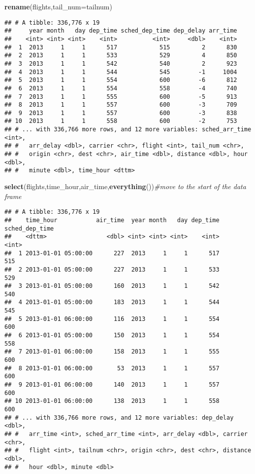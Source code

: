 \documentclass[]{article}
\newenvironment{Shaded}{\begin{snugshade}}{\end{snugshade}}
\newcommand{\CommentTok}[1]{\textcolor[rgb]{0.56,0.35,0.01}{\textit{#1}}}
\newcommand{\DataTypeTok}[1]{\textcolor[rgb]{0.13,0.29,0.53}{#1}}
\newcommand{\KeywordTok}[1]{\textcolor[rgb]{0.13,0.29,0.53}{\textbf{#1}}}
\newcommand{\NormalTok}[1]{#1}
\begin{document}
\begin{Shaded}
\begin{Highlighting}[]
\KeywordTok{rename}\NormalTok{(flights,}\DataTypeTok{tail_num=}\NormalTok{tailnum)}
\end{Highlighting}
\end{Shaded}

\begin{verbatim}
## # A tibble: 336,776 x 19
##     year month   day dep_time sched_dep_time dep_delay arr_time
##    <int> <int> <int>    <int>          <int>     <dbl>    <int>
##  1  2013     1     1      517            515         2      830
##  2  2013     1     1      533            529         4      850
##  3  2013     1     1      542            540         2      923
##  4  2013     1     1      544            545        -1     1004
##  5  2013     1     1      554            600        -6      812
##  6  2013     1     1      554            558        -4      740
##  7  2013     1     1      555            600        -5      913
##  8  2013     1     1      557            600        -3      709
##  9  2013     1     1      557            600        -3      838
## 10  2013     1     1      558            600        -2      753
## # ... with 336,766 more rows, and 12 more variables: sched_arr_time <int>,
## #   arr_delay <dbl>, carrier <chr>, flight <int>, tail_num <chr>,
## #   origin <chr>, dest <chr>, air_time <dbl>, distance <dbl>, hour <dbl>,
## #   minute <dbl>, time_hour <dttm>
\end{verbatim}

\begin{Shaded}
\begin{Highlighting}[]
\KeywordTok{select}\NormalTok{(flights,time_hour,air_time,}\KeywordTok{everything}\NormalTok{())}\CommentTok{#move to the start of the data frame}
\end{Highlighting}
\end{Shaded}

\begin{verbatim}
## # A tibble: 336,776 x 19
##    time_hour           air_time  year month   day dep_time sched_dep_time
##    <dttm>                 <dbl> <int> <int> <int>    <int>          <int>
##  1 2013-01-01 05:00:00      227  2013     1     1      517            515
##  2 2013-01-01 05:00:00      227  2013     1     1      533            529
##  3 2013-01-01 05:00:00      160  2013     1     1      542            540
##  4 2013-01-01 05:00:00      183  2013     1     1      544            545
##  5 2013-01-01 06:00:00      116  2013     1     1      554            600
##  6 2013-01-01 05:00:00      150  2013     1     1      554            558
##  7 2013-01-01 06:00:00      158  2013     1     1      555            600
##  8 2013-01-01 06:00:00       53  2013     1     1      557            600
##  9 2013-01-01 06:00:00      140  2013     1     1      557            600
## 10 2013-01-01 06:00:00      138  2013     1     1      558            600
## # ... with 336,766 more rows, and 12 more variables: dep_delay <dbl>,
## #   arr_time <int>, sched_arr_time <int>, arr_delay <dbl>, carrier <chr>,
## #   flight <int>, tailnum <chr>, origin <chr>, dest <chr>, distance <dbl>,
## #   hour <dbl>, minute <dbl>
\end{verbatim}
\end{document}
